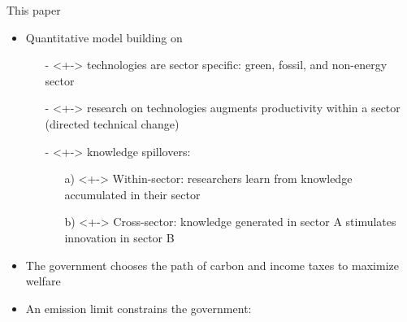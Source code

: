 \documentclass[11pt,aspectratio=169]{beamer}
\begin{document}
\begin{frame}{This paper}
	\vspace{-4mm}
	\begin{itemize}
		\item<+-> Quantitative model building on \cite{Fried2018ClimateAnalysis} 
		\vspace{2mm}
		\begin{itemize}
			\item[-]<+-> \alert{technologies are sector specific}: green, fossil, and non-energy sector 
			\vspace{1mm}
			\item[-]<+-> \alert{research} on technologies augments productivity within a sector \\ \footnotesize{(directed technical change) }
			\vspace{1mm}
			\item[-]<+-> \alert{knowledge spillovers}: 
			\begin{enumerate}
				\item[a)]<+-> \alert{Within-sector}: researchers learn from knowledge accumulated in their sector
				\item[b)]<+-> \alert{Cross-sector}: knowledge generated in sector A stimulates innovation in sector B
			\end{enumerate}%
		\end{itemize}
		\vspace{2mm}
		\item<+->   The government   chooses the \alert{path of carbon and income taxes} to maximize welfare\vspace{2mm}
		\item<+-> An \alert{emission limit} constrains the government: 
	\end{itemize}
	\pause
	\vspace{0mm}
	\centering
\end{frame}
\end{document}
